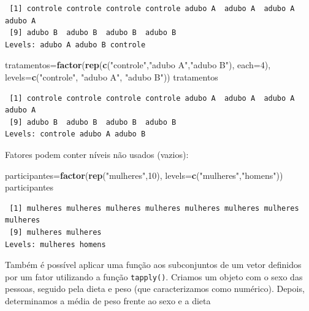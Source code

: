 \documentclass[12pt,brazil,]{book}
\newenvironment{Shaded}{\begin{snugshade}}{\end{snugshade}}
\newcommand{\DataTypeTok}[1]{\textcolor[rgb]{0.13,0.29,0.53}{#1}}
\newcommand{\DecValTok}[1]{\textcolor[rgb]{0.00,0.00,0.81}{#1}}
\newcommand{\KeywordTok}[1]{\textcolor[rgb]{0.13,0.29,0.53}{\textbf{#1}}}
\newcommand{\NormalTok}[1]{#1}
\newcommand{\StringTok}[1]{\textcolor[rgb]{0.31,0.60,0.02}{#1}}
\begin{document}
\begin{verbatim}
 [1] controle controle controle controle adubo A  adubo A  adubo A  adubo A 
 [9] adubo B  adubo B  adubo B  adubo B 
Levels: adubo A adubo B controle
\end{verbatim}

\begin{Shaded}
\begin{Highlighting}[]
\NormalTok{tratamentos=}\KeywordTok{factor}\NormalTok{(}\KeywordTok{rep}\NormalTok{(}\KeywordTok{c}\NormalTok{(}\StringTok{"controle"}\NormalTok{,}\StringTok{"adubo A"}\NormalTok{,}\StringTok{"adubo B"}\NormalTok{), }\DataTypeTok{each=}\DecValTok{4}\NormalTok{), }
\DataTypeTok{levels=}\KeywordTok{c}\NormalTok{(}\StringTok{"controle"}\NormalTok{, }\StringTok{"adubo A"}\NormalTok{, }\StringTok{"adubo B"}\NormalTok{))}
\NormalTok{tratamentos}
\end{Highlighting}
\end{Shaded}

\begin{verbatim}
 [1] controle controle controle controle adubo A  adubo A  adubo A  adubo A 
 [9] adubo B  adubo B  adubo B  adubo B 
Levels: controle adubo A adubo B
\end{verbatim}

Fatores podem conter níveis não usados (vazios):

\begin{Shaded}
\begin{Highlighting}[]
\NormalTok{participantes=}\KeywordTok{factor}\NormalTok{(}\KeywordTok{rep}\NormalTok{(}\StringTok{"mulheres"}\NormalTok{,}\DecValTok{10}\NormalTok{), }\DataTypeTok{levels=}\KeywordTok{c}\NormalTok{(}\StringTok{"mulheres"}\NormalTok{,}\StringTok{"homens"}\NormalTok{))}
\NormalTok{participantes}
\end{Highlighting}
\end{Shaded}

\begin{verbatim}
 [1] mulheres mulheres mulheres mulheres mulheres mulheres mulheres mulheres
 [9] mulheres mulheres
Levels: mulheres homens
\end{verbatim}

Também é possível aplicar uma função aos subconjuntos de um vetor
definidos por um fator utilizando a função \texttt{tapply()}. Criamos um
objeto com o sexo das pessoas, seguido pela dieta e peso (que
caracterizamos como numérico). Depois, determinamos a média de peso
frente ao sexo e a dieta
\end{document}

